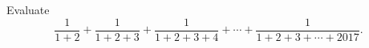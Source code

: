 Evaluate
\[
\dfrac{1}{1+2}+\dfrac{1}{1+2+3}+\dfrac{1}{1+2+3+4}+\cdots+\dfrac{1}{1+2+3+\cdots+2017} .
\]
